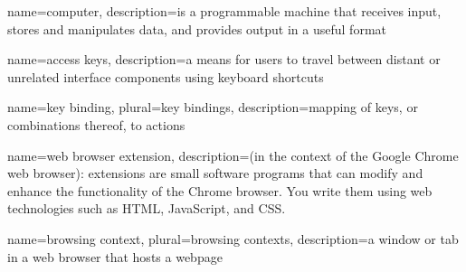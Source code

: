 {
  name=computer,
  description={is a programmable machine that receives input,
               stores and manipulates data, and provides
               output in a useful format}
}





{
  name=access keys,
  description={a means for users to travel between distant or unrelated interface components using keyboard shortcuts}
}

{
  name=key binding,
  plural=key bindings,
  description={mapping of keys, or combinations thereof, to actions}
}

{
  name=web browser extension,
  description={(in the context of the Google Chrome web browser): extensions are small software programs that can modify and enhance the functionality of the Chrome browser. You write them using web technologies such as HTML, JavaScript, and CSS.}
}

{
  name=browsing context,
  plural=browsing contexts,
  description={a window or tab in a web browser that hosts a webpage}
}